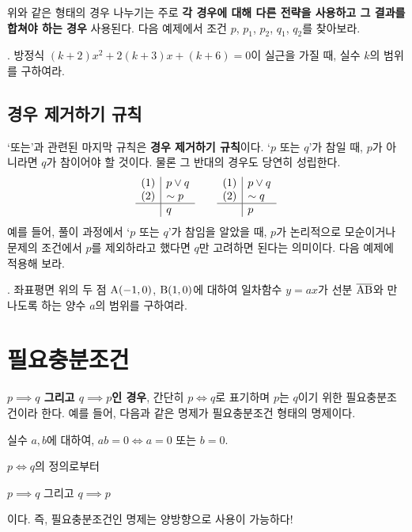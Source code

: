 위와 같은 형태의 경우 나누기는 주로 \textbf{각 경우에 대해 다른 전략을 사용하고 그 결과를 합쳐야 하는 경우} 사용된다. 다음 예제에서 조건 \(p\), \(p_1\), \(p_2\), \(q_1\), \(q_2\)를 찾아보라.

\bigskip

\ex. 방정식 \((k + 2)x^2 + 2(k + 3)x + (k + 6) = 0\)이 실근을 가질 때, 실수 \(k\)의 범위를 구하여라.

\pagebreak

\subsection{경우 제거하기 규칙}

`또는'과 관련된 마지막 규칙은 \textbf{경우 제거하기 규칙}이다. `\(p\) 또는 \(q\)'가 참일 때, \(p\)가 아니라면 \(q\)가 참이어야 할 것이다. 물론 그 반대의 경우도 당연히 성립한다.
\[
    \begin{array}{c|l}
        (1) & p \vee q \\ (2) & \sim p \\\hline & q
    \end{array}
    \qquad
    \begin{array}{c|l}
        (1) & p \vee q \\ (2) & \sim q \\\hline & p
    \end{array}
\]
예를 들어, 풀이 과정에서 `\(p\) 또는 \(q\)'가 참임을 알았을 때, \(p\)가 논리적으로 모순이거나 문제의 조건에서 \(p\)를 제외하라고 했다면 \(q\)만 고려하면 된다는 의미이다. 다음 예제에 적용해 보라.

\bigskip

\ex. 좌표평면 위의 두 점 \(\rm{A}(-1, 0)\), \(\rm{B}(1, 0)\)에 대하여 일차함수 \(y = ax\)가 선분 \(\overline{\rm{AB}}\)와 만나도록 하는 양수 \(a\)의 범위를 구하여라.

\pagebreak

\section{필요충분조건}

\textbf{\(p \implies q\) 그리고 \(q \implies p\)인 경우}, 간단히 \(p \iff q\)로 표기하며 \(p\)는 \(q\)이기 위한 필요충분조건이라 한다. 예를 들어, 다음과 같은 명제가 필요충분조건 형태의 명제이다.
\begin{center}
    실수 \(a, b\)에 대하여, \(ab = 0 \iff a = 0\) 또는 \(b = 0\).
\end{center}

\(p \iff q\)의 정의로부터
\begin{center}
    \(p \implies q\) 그리고 \(q \implies p\)
\end{center}
이다. 즉, 필요충분조건인 명제는 양방향으로 사용이 가능하다!

